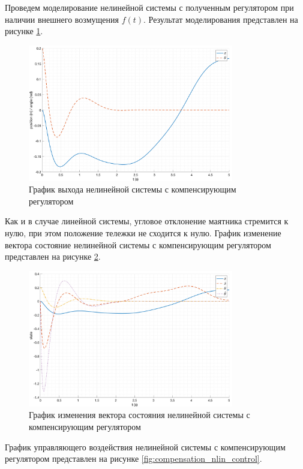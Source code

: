 Проведем моделирование нелинейной системы с полученным регулятором при наличии внешнего возмущения $f(t)$.
Результат моделирования представлен на рисунке \ref{fig:compensation_nlin}.
\begin{figure}[ht!]
    \centering
    \includegraphics[width=0.8\textwidth]{media/plots/compensation/out_1.png}
    \caption{График выхода нелинейной системы с компенсирующим регулятором}
    \label{fig:compensation_nlin}
\end{figure}
Как и в случае линейной системы, угловое отклонение маятника стремится к нулю, при этом 
положение тележки не сходится к нулю. 
График изменение вектора состояние нелинейной системы с компенсирующим регулятором представлен на рисунке \ref{fig:compensation_nlin_state}.
\begin{figure}[ht!]
    \centering
    \includegraphics[width=0.8\textwidth]{media/plots/compensation/state_1.png}
    \caption{График изменения вектора состояния нелинейной системы с компенсирующим регулятором}
    \label{fig:compensation_nlin_state}
\end{figure}
График управляющего воздействия нелинейной системы с компенсирующим регулятором представлен на рисунке \ref{fig:compensation_nlin_control}.
